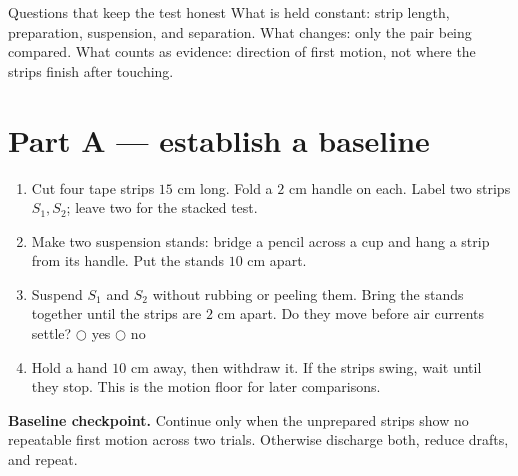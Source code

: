 \begin{telospanel}{Questions that keep the test honest}
What is held constant: strip length, preparation, suspension, and separation.
What changes: only the pair being compared. What counts as evidence: direction
of first motion, not where the strips finish after touching.
\end{telospanel}

\section{Part A --- establish a baseline}

\begin{enumerate}
  \item Cut four tape strips \(15\) cm long. Fold a \(2\) cm handle on each.
    Label two strips \(S_1,S_2\); leave two for the stacked test.
  \item Make two suspension stands: bridge a pencil across a cup and hang a
    strip from its handle. Put the stands \(10\) cm apart.
  \item Suspend \(S_1\) and \(S_2\) without rubbing or peeling them. Bring the
    stands together until the strips are \(2\) cm apart. Do they move before
    air currents settle? \(\bigcirc\) yes \(\bigcirc\) no
  \item Hold a hand \(10\) cm away, then withdraw it. If the strips swing, wait
    until they stop. This is the motion floor for later comparisons.
\end{enumerate}

\begin{center}
\end{center}

\vspace{-1em}
\noindent\textbf{Baseline checkpoint.} Continue only when the unprepared strips
show no repeatable first motion across two trials. Otherwise discharge both,
reduce drafts, and repeat.

